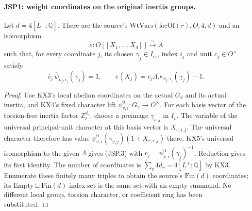 \paragraph{JSP1: weight coordinates on the original inertia groups.}
\label{claim:JSP1}
Let $d=4[L^+:\mathbb Q]$. There are the source's
$\mathrm{WtVars}(\mathrm{locOf}(r),O,4,d)$ and an isomorphism
\[
 e:O[[X_1,\ldots,X_d]]\xrightarrow{\sim}A
\]
such that, for every coordinate $j$, its chosen
$\gamma_j\in I_{v_j}$, index $i_j$ and unit $c_j\in O^\times$
satisfy
\[
 \overline c_j\,\overline\psi_{v_j,i_j}(\gamma_j)=1,
 \qquad
 e(X_j)=c_j\Lambda.\kappa_{v_j,i_j}(\gamma_j)-1.       \tag{JSP.3}
\]
\begin{proof}
Use KX3's local abelian coordinates on the actual $G_v$ and its
actual inertia, and KX4's fixed character lift
$\psi^0_{v,i}:G_v\to O^\times$. For each basis vector of the
torsion-free inertia factor $\mathbb Z_\ell^{d_v}$, choose a
preimage $\gamma_{v,j}$ in $I_v$. The variable of the universal
principal-unit character at this basis vector is $X_{v,i,j}$.
The universal character therefore has value
$\psi^0_{v,i}(\gamma_{v,j})(1+X_{v,i,j})$ there.
KX5's universal isomorphism to the given $\Lambda$ gives
(JSP.3) with $c_j=\psi^0_{v,i}(\gamma_j)^{-1}$.
Reduction gives its first identity. The number of coordinates is
$\sum_v4d_v=4[L^+:\mathbb Q]$ by KX3.
Enumerate these finitely many triples to obtain the source's
$\mathrm{Fin}(d)$ coordinates; its $\mathrm{Empty}\sqcup\mathrm{Fin}(d)$
index set is the same set with an empty summand. No different local
group, torsion character, or coefficient ring has been substituted.
\end{proof}

